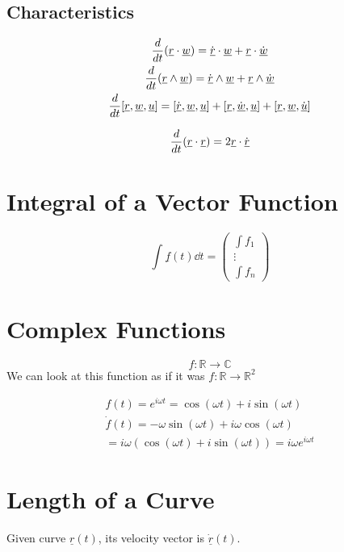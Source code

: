\documentclass[00_complete]{subfiles}
\begin{document}
\subsection{Characteristics}
\begin{gather}
    \dv{t}(\underline r \cdot \underline w) = \dot{\underline r} \cdot
    \underline w + \underline r \cdot \dot{\underline w} \\
    \dv{t}(\underline r \land \underline w) = \dot{\underline r} \land
    \underline w + \underline r \land \dot{\underline w} \\
    \dv{t}[\underline r, \underline w, \underline u] = [\dot{\underline r},
    \underline w, \underline u] + [\underline r, \dot{\underline w}, \underline
    u] + [\underline r, \underline w, \dot{\underline u}]
\end{gather}
\begin{example}
    $$\dv{t}(\underline r \cdot \underline r) = 2\underline r \cdot
    \dot{\underline r}$$
\end{example}
\section{Integral of a Vector Function}
\begin{definition}
    $$\int \underline f(t)\dd{t} = \begin{pmatrix}
        \int f_1 \\ \vdots \\ \int f_n
    \end{pmatrix}$$
\end{definition}
\section{Complex Functions}
$$f: \mathbb{R} \to \mathbb{C}$$
We can look at this function as if it was $f: \mathbb{R} \to \mathbb{R}^2$
\begin{example}
\begin{gather*}
    f(t)=e^{i\omega t} = \cos(\omega t) + i\sin(\omega t) \\
    \dot f(t) = - \omega \sin(\omega t) + i \omega \cos(\omega t) \\
    =i\omega(\cos(\omega t) + i\sin(\omega t)) = i \omega e^{i \omega t}
\end{gather*}
\end{example}
\section{Length of a Curve}
Given curve $\underline r(t)$, its velocity vector is $\dot{\underline r}(t)$.
\end{document}
